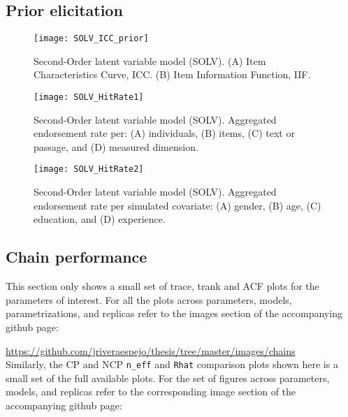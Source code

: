\subsection{Prior elicitation}
%
\begin{figure}[H]
	\centering
	\texttt{[image: SOLV\_ICC\_prior]}
	\caption[Second-Order latent variable model (SOLV). Item Characteristic Curve (ICC) and Item Information Function (IIF).]%
	{Second-Order latent variable model (SOLV). (A) Item Characteristics Curve, ICC. (B) Item Information Function, IIF.}
	\label{fig:SOLV_ICC_prior}
\end{figure}
%
\begin{figure}[H]
	\centering
	\texttt{[image: SOLV\_HitRate1]}
	\caption[Second-Order latent variable model (SOLV). Hit rate per dimensions of interest.]%
	{Second-Order latent variable model (SOLV). Aggregated endorsement rate per: (A) individuals, (B) items, (C) text or passage, and (D) measured dimension.}
	\label{fig:SOLV_hitrate1}
\end{figure}
%
\begin{figure}[H]
	\centering
	\texttt{[image: SOLV\_HitRate2]}
	\caption[Second-Order latent variable model (SOLV). Hit rate per simulated covariate.]%
	{Second-Order latent variable model (SOLV). Aggregated endorsement rate per simulated covariate: (A) gender, (B) age, (C) education, and (D) experience.}
	\label{fig:SOLV_hitrate2}
\end{figure}


\subsection{Chain performance} \label{sub_sect:chain_performance}

This section only shows a small set of trace, trank and ACF plots for the parameters of interest. For all the plots across parameters, models, parametrizations, and replicas refer to the images section of the accompanying github page:

\noindent \url{https://github.com/jriveraespejo/thesis/tree/master/images/chains} \\

\noindent Similarly, the CP and NCP \texttt{n\_eff} and \texttt{Rhat} comparison plots shown here is a small set of the full available plots. For the set of figures across parameters, models, and replicas refer to the corresponding image section of the accompanying github page:

